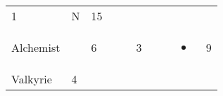 \documentclass[12pt]{article}
\newcommand{\indexClass}[1]{\index{#1}}
\newcommand{\class}[1]{#1\indexClass{#1}}
\begin{document}
\begin{longtable}[]{@{}llllllllll@{}}
\begin{minipage}[t]{0.06\columnwidth}
1
\strut\end{minipage} &
\begin{minipage}[t]{0.07\columnwidth}\raggedright\strut
N
\strut\end{minipage} &
\begin{minipage}[t]{0.08\columnwidth}\raggedright\strut
15
\strut\end{minipage}\tabularnewline
\begin{minipage}[t]{0.13\columnwidth}\raggedright\strut
\class{Alchemist}
\strut\end{minipage} &
\begin{minipage}[t]{0.06\columnwidth}\raggedright\strut
\strut\end{minipage} &
\begin{minipage}[t]{0.06\columnwidth}\raggedright\strut
6
\strut\end{minipage} &
\begin{minipage}[t]{0.06\columnwidth}\raggedright\strut
\strut\end{minipage} &
\begin{minipage}[t]{0.06\columnwidth}\raggedright\strut
\strut\end{minipage} &
\begin{minipage}[t]{0.06\columnwidth}\raggedright\strut
3
\strut\end{minipage} &
\begin{minipage}[t]{0.06\columnwidth}\raggedright\strut
\strut\end{minipage} &
\begin{minipage}[t]{0.06\columnwidth}\raggedright\strut
\strut\end{minipage} &
\begin{minipage}[t]{0.07\columnwidth}\raggedright\strut
\begin{itemize}
\item
\end{itemize}
\strut\end{minipage} &
\begin{minipage}[t]{0.08\columnwidth}\raggedright\strut
9
\strut\end{minipage}\tabularnewline
\begin{minipage}[t]{0.13\columnwidth}\raggedright\strut
\class{Valkyrie}
\strut\end{minipage} &
\begin{minipage}[t]{0.06\columnwidth}\raggedright\strut
4
\strut\end{minipage} &
\begin{minipage}[t]{0.06\columnwidth}\raggedright\strut

\end{minipage}
\end{longtable}
\end{document}
